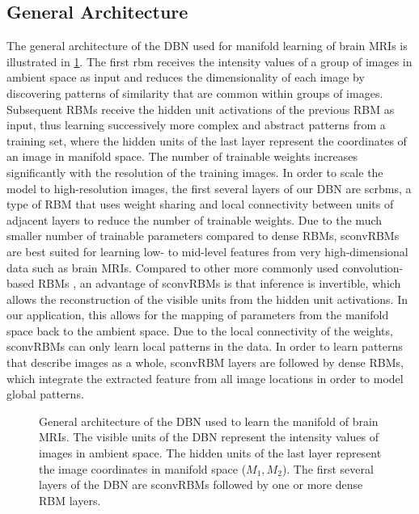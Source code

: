 \subsection[General architecture]{General Architecture}
\label{sec:general_arch}

The general architecture of the DBN used for manifold learning of brain MRIs is
illustrated in \ref{fig:manidbn}. The first \gls{rbm} receives the intensity
values of a group of images in ambient space as input and reduces the
dimensionality of each image by discovering patterns of similarity that are
common within groups of images. Subsequent RBMs receive the hidden unit
activations of the previous RBM as input, thus learning successively more
complex and abstract patterns from a training set, where the hidden units of the
last layer represent the coordinates of an image in manifold space. The number
of trainable weights increases significantly with the resolution of the training
images. In order to scale the model to high-resolution images, the first several
layers of our DBN are \glspl{scrbm}, a type of RBM that uses weight sharing and
local connectivity between units of adjacent layers to reduce the number of
trainable weights. Due to the much smaller number of trainable parameters
compared to dense RBMs, sconvRBMs are best suited for learning low- to mid-level
features from very high-dimensional data such as brain MRIs. Compared to other
more commonly used convolution-based RBMs \citep{lee2009}, an advantage of
sconvRBMs is that inference is invertible, which allows the reconstruction of
the visible units from the hidden unit activations. In our application, this
allows for the mapping of parameters from the manifold space back to the ambient
space. Due to the local connectivity of the weights, sconvRBMs can only learn
local patterns in the data. In order to learn patterns that describe images as a
whole, sconvRBM layers are followed by dense RBMs, which integrate the extracted
feature from all image locations in order to model global patterns.

\begin{figure}
\centering


\caption[General architecture of the DBN used to learn the manifold of brain
MRIs]{General architecture of the DBN used to learn the manifold of brain
MRIs. The visible units of the DBN represent the intensity values of images in
ambient space. The hidden units of the last layer represent the image
coordinates in manifold space ($M_1, M_2$). The first several layers of the DBN
are sconvRBMs followed by one or more dense RBM layers.}

\label{fig:manidbn}
\end{figure}

